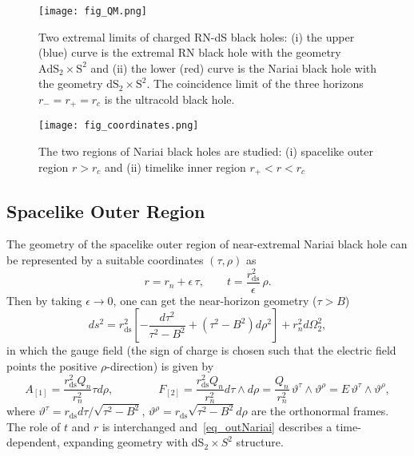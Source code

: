 \documentclass[aps,nofootinbib,superscriptaddress
]{revtex4}
\begin{document}
\begin{figure}
\texttt{[image: fig\_QM.png]}
\caption{Two extremal limits of charged RN-dS black holes: (i) the upper (blue) curve is the extremal RN black hole with the geometry $\mathrm{AdS}_2 \times \mathrm{S}^2$ and (ii) the lower (red) curve is the Nariai black hole with the geometry $\mathrm{dS}_2 \times \mathrm{S}^2$. The coincidence limit of the three horizons $r_- = r_+ = r_c$ is the ultracold black hole.}
\label{fig_QvsM}
\end{figure}

\begin{figure}
\texttt{[image: fig\_coordinates.png]}
\caption{The two regions of Nariai black holes are studied: (i) spacelike outer region $r > r_c$ and (ii) timelike inner region $r_+ < r < r_c$}
\label{fig_coordinates}
\end{figure}



\subsection{Spacelike Outer Region}
The geometry of the spacelike outer region of near-extremal Nariai black hole can be represented by a suitable coordinates $(\tau, \rho)$ as
\begin{equation}
r = r_n + \epsilon \, \tau, \qquad t = \frac{r_\mathrm{ds}^2}{\epsilon} \, \rho.
\end{equation}
Then by taking $\epsilon \to 0$, one can get the near-horizon geometry ($\tau > B$)
\begin{equation} \label{eq_outNariai}
ds^2 = r_\mathrm{ds}^2 \left[ - \frac{d\tau^2}{\tau^2 - B^2} + (\tau^2 - B^2) d\rho^2 \right] + r_n^2 d\Omega_2^2,
\end{equation}
in which the gauge field (the sign of charge is chosen such that the electric field points the positive $\rho$-direction) is given by
\begin{equation}
A_{[1]} = \frac{r_\mathrm{ds}^2 Q_n}{r_n^2} \tau d\rho, \qquad \qquad F_{[2]} = \frac{r_\mathrm{ds}^2 Q_n}{r_n^2} d\tau \wedge d\rho = \frac{Q_n}{r_n^2} \, \vartheta^\tau \wedge \vartheta^\rho = E \, \vartheta^\tau \wedge \vartheta^\rho,
\end{equation}
where $\vartheta^\tau = r_\mathrm{ds} d\tau/\sqrt{\tau^2 - B^2}, \, \vartheta^\rho = r_\mathrm{ds} \sqrt{\tau^2 - B^2} d\rho$ are the orthonormal frames. The role of $t$ and $r$ is interchanged and~\eqref{eq_outNariai} describes a time-dependent, expanding geometry with dS$_2 \times S^2$ structure.
\end{document}
